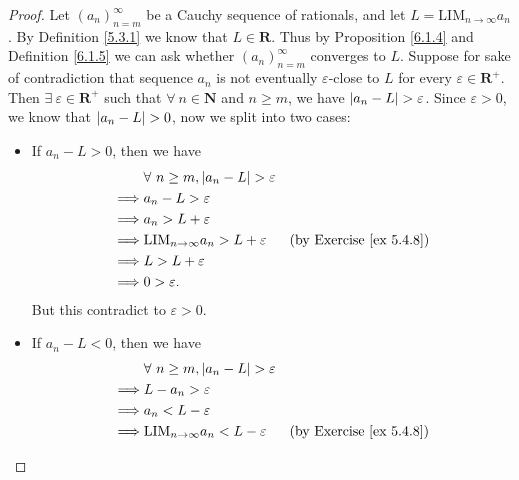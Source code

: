 \begin{proof}
    Let \((a_n)_{n = m}^\infty\) be a Cauchy sequence of rationals, and let \(L = \text{LIM}_{n \to \infty} a_n\).
    By Definition \ref{5.3.1} we know that \(L \in \mathbf{R}\).
    Thus by Proposition \ref{6.1.4} and Definition \ref{6.1.5} we can ask whether \((a_n)_{n = m}^\infty\) converges to \(L\).
    Suppose for sake of contradiction that sequence \(a_n\) is not eventually \(\varepsilon\)-close to \(L\) for every \(\varepsilon \in \mathbf{R}^+\).
    Then \(\exists\ \varepsilon \in \mathbf{R}^+\) such that \(\forall\ n \in \mathbf{N}\) and \(n \geq m\), we have \(\abs*{a_n - L} > \varepsilon\).
    Since \(\varepsilon > 0\), we know that \(\abs*{a_n - L} > 0\), now we split into two cases:
    \begin{itemize}
        \item If \(a_n - L > 0\), then we have
              \begin{align*}
                           & \forall\ n \geq m, \abs*{a_n - L} > \varepsilon                                       \\
                  \implies & a_n - L > \varepsilon                                                                 \\
                  \implies & a_n > L + \varepsilon                                                                 \\
                  \implies & \text{LIM}_{n \to \infty} a_n > L + \varepsilon & \text{(by Exercise \ref{ex 5.4.8})} \\
                  \implies & L > L + \varepsilon                                                                   \\
                  \implies & 0 > \varepsilon.
              \end{align*}
              But this contradict to \(\varepsilon > 0\).
        \item If \(a_n - L < 0\), then we have
              \begin{align*}
                           & \forall\ n \geq m, \abs*{a_n - L} > \varepsilon                                       \\
                  \implies & L - a_n > \varepsilon                                                                 \\
                  \implies & a_n < L - \varepsilon                                                                 \\
                  \implies & \text{LIM}_{n \to \infty} a_n < L - \varepsilon & \text{(by Exercise \ref{ex 5.4.8})} \\

\end{align*}
\end{itemize}
\end{proof}
